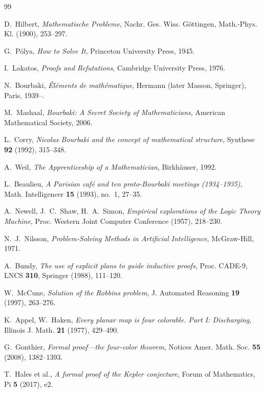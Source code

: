 \documentclass[11pt]{amsart}
\theoremstyle{definition}
\theoremstyle{remark}
\begin{document}
\begin{thebibliography}{99}
\itemsep2pt

 D.~Hilbert, \emph{Mathematische Probleme}, Nachr. Ges.
Wiss. G\"ottingen, Math.-Phys. Kl. (1900), 253--297.

 G.~P\'olya, \emph{How to Solve It}, Princeton University
Press, 1945.

 I.~Lakatos, \emph{Proofs and Refutations}, Cambridge
University Press, 1976.

 N.~Bourbaki, \emph{\'El\'ements de math\'ematique}, Hermann
(later Masson, Springer), Paris, 1939--.

 M.~Mashaal, \emph{Bourbaki: A Secret Society of
Mathematicians}, American Mathematical Society, 2006.

 L.~Corry, \emph{Nicolas Bourbaki and the concept of
mathematical structure}, Synthese \textbf{92} (1992), 315--348.

 A.~Weil, \emph{The Apprenticeship of a Mathematician},
Birkh\"auser, 1992.

 L.~Beaulieu, \emph{A Parisian caf\'e and ten proto-Bourbaki
meetings (1934--1935)}, Math. Intelligencer \textbf{15} (1993), no.~1, 27--35.

 A.~Newell, J.~C.~Shaw, H.~A.~Simon, \emph{Empirical
explorations of the Logic Theory Machine}, Proc. Western Joint Computer
Conference (1957), 218--230.

 N.~J.~Nilsson, \emph{Problem-Solving Methods in Artificial
Intelligence}, McGraw-Hill, 1971.

 A.~Bundy, \emph{The use of explicit plans to guide inductive
proofs}, Proc. CADE-9, LNCS \textbf{310}, Springer (1988), 111--120.

 W.~McCune, \emph{Solution of the Robbins problem}, J.
Automated Reasoning \textbf{19} (1997), 263--276.

 K.~Appel, W.~Haken, \emph{Every planar map is four
colorable. Part I: Discharging}, Illinois J. Math. \textbf{21} (1977), 429--490.

 G.~Gonthier, \emph{Formal proof---the four-color theorem},
Notices Amer. Math. Soc. \textbf{55} (2008), 1382--1393.

 T.~Hales et al., \emph{A formal proof of the Kepler
conjecture}, Forum of Mathematics, Pi \textbf{5} (2017), e2.


\end{thebibliography}
\end{document}

